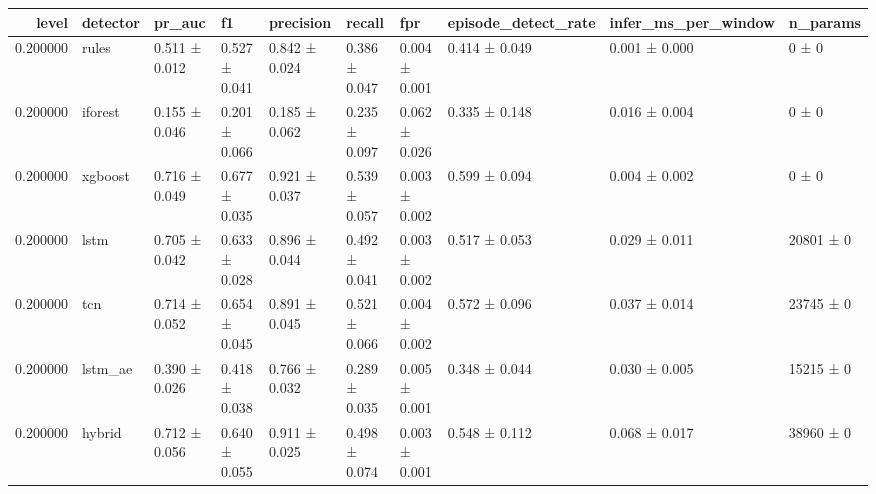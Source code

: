 \begin{tabular}{rlllllllll}
\toprule
level & detector & pr\_auc & f1 & precision & recall & fpr & episode\_detect\_rate & infer\_ms\_per\_window & n\_params \\
\midrule
0.200000 & rules & 0.511 ± 0.012 & 0.527 ± 0.041 & 0.842 ± 0.024 & 0.386 ± 0.047 & 0.004 ± 0.001 & 0.414 ± 0.049 & 0.001 ± 0.000 & 0 ± 0 \\
0.200000 & iforest & 0.155 ± 0.046 & 0.201 ± 0.066 & 0.185 ± 0.062 & 0.235 ± 0.097 & 0.062 ± 0.026 & 0.335 ± 0.148 & 0.016 ± 0.004 & 0 ± 0 \\
0.200000 & xgboost & 0.716 ± 0.049 & 0.677 ± 0.035 & 0.921 ± 0.037 & 0.539 ± 0.057 & 0.003 ± 0.002 & 0.599 ± 0.094 & 0.004 ± 0.002 & 0 ± 0 \\
0.200000 & lstm & 0.705 ± 0.042 & 0.633 ± 0.028 & 0.896 ± 0.044 & 0.492 ± 0.041 & 0.003 ± 0.002 & 0.517 ± 0.053 & 0.029 ± 0.011 & 20801 ± 0 \\
0.200000 & tcn & 0.714 ± 0.052 & 0.654 ± 0.045 & 0.891 ± 0.045 & 0.521 ± 0.066 & 0.004 ± 0.002 & 0.572 ± 0.096 & 0.037 ± 0.014 & 23745 ± 0 \\
0.200000 & lstm\_ae & 0.390 ± 0.026 & 0.418 ± 0.038 & 0.766 ± 0.032 & 0.289 ± 0.035 & 0.005 ± 0.001 & 0.348 ± 0.044 & 0.030 ± 0.005 & 15215 ± 0 \\
0.200000 & hybrid & 0.712 ± 0.056 & 0.640 ± 0.055 & 0.911 ± 0.025 & 0.498 ± 0.074 & 0.003 ± 0.001 & 0.548 ± 0.112 & 0.068 ± 0.017 & 38960 ± 0 \\
\bottomrule
\end{tabular}
